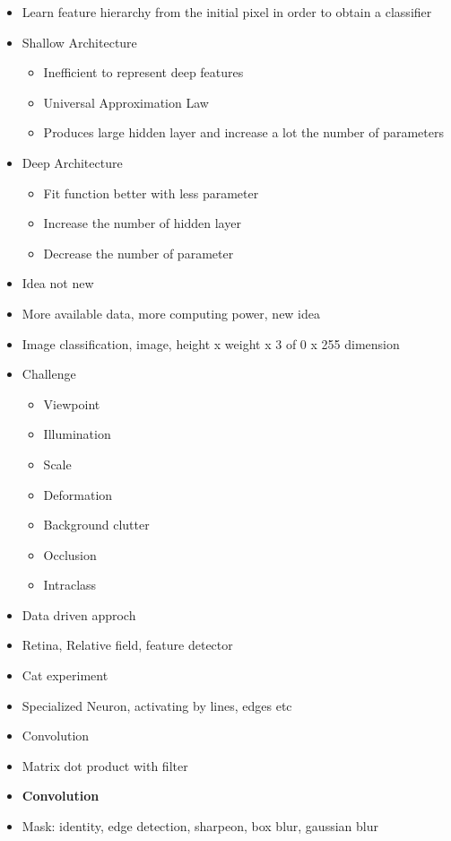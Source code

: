 \begin{itemize}
    \item Learn feature hierarchy from the initial pixel in order to obtain a classifier
    \item Shallow Architecture
    \begin{itemize}
        \item Inefficient to represent deep features
        \item Universal Approximation Law
        \item Produces large hidden layer and increase a lot the number of parameters 
    \end{itemize}
    \item Deep Architecture
    \begin{itemize}
        \item Fit function better with less parameter
        \item Increase the number of hidden layer
        \item Decrease the number of parameter
    \end{itemize}
    \item Idea not new
    \item More available data, more computing power, new idea
    \item Image classification, image, height x weight x 3 of 0 x 255 dimension
    \item Challenge
    \begin{itemize}
        \item Viewpoint 
        \item Illumination 
        \item Scale
        \item Deformation
        \item Background clutter
        \item Occlusion
        \item Intraclass 
    \end{itemize}
    \item Data driven approch
    \item Retina, Relative field, feature detector
    \item Cat experiment
    \item Specialized Neuron, activating by lines, edges etc
    \item Convolution
    \item Matrix dot product with filter
    \item \textbf{Convolution}
    \item Mask: identity, edge detection, sharpeon, box blur, gaussian blur

\end{itemize}
